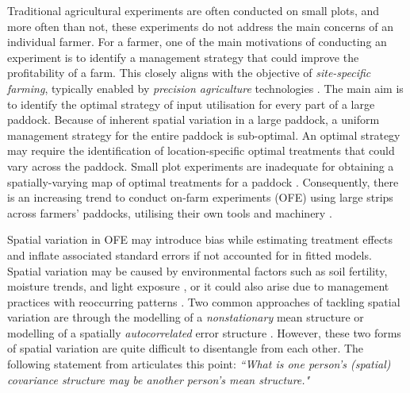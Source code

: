 \documentclass[a4paper]{article}   	%
\begin{document}
	Traditional agricultural experiments are often conducted on small plots, and more often than not, these experiments do not address the main concerns of an individual farmer. For a farmer, one of the main motivations of conducting an experiment is to identify a management strategy that could improve the profitability of a farm. This closely aligns with the objective of \emph{site-specific farming}, typically enabled by \emph{precision agriculture} technologies \parencite{Cook1998Precision}. The main aim is to identify the optimal strategy of input utilisation for every part of a large paddock. Because of inherent spatial variation in a large paddock, a uniform management strategy for the entire paddock is sub-optimal. An optimal strategy may require the identification of location-specific optimal treatments that could vary across the paddock. Small plot experiments are inadequate for obtaining a spatially-varying map of optimal treatments for a paddock \parencite{Rakshit2020Novel, Evans2020Assessment}. Consequently, there is an increasing trend to conduct on-farm experiments (OFE) using large strips across farmers' paddocks, utilising their own tools and machinery \parencite{Yan2002Onfarm, Rakshit2020Novel, Evans2020Assessment}. 
	
	
	Spatial variation in OFE may introduce bias while estimating treatment effects and inflate associated standard errors if not accounted for in fitted models. Spatial variation may be caused by environmental factors such as soil fertility, moisture trends, and light exposure \parencite{Selle2019Flexible}, or it could also arise due to management practices with reoccurring patterns \parencite{Gilmour1997Accounting, Hinkelmann2012Design}. Two common approaches of tackling spatial variation are through the modelling of a \emph{nonstationary} mean structure or modelling of a spatially \emph{autocorrelated} error structure \parencite{Fotheringham2009Problem, Harris2019Simulation}. However, these two forms of spatial variation are quite difficult to disentangle from each other. The following statement from \parencite{Cressie1993Statistics} articulates this point: \textit{``What is one person's (spatial) covariance structure may be another person's mean structure."} 
	
\end{document}
